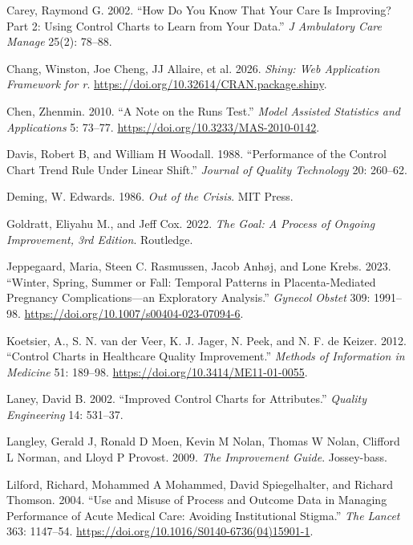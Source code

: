 \documentclass[
]{book}
\newlength{\cslhangindent}
\newenvironment{CSLReferences}[2] %
 {\begin{list}{}{%
  \setlength{\itemindent}{0pt}
  \setlength{\leftmargin}{0pt}
  \setlength{\parsep}{0pt}
  \ifodd #1
   \setlength{\leftmargin}{\cslhangindent}
   \setlength{\itemindent}{-1\cslhangindent}
  \fi
  \setlength{\itemsep}{#2\baselineskip}}}
 {\end{list}}
\begin{document}
\begin{CSLReferences}{1}{1}
Carey, Raymond G. 2002. {``How Do You Know That Your Care Is Improving?
Part 2: Using Control Charts to Learn from Your Data.''} \emph{J
Ambulatory Care Manage} 25(2): 78--88.

Chang, Winston, Joe Cheng, JJ Allaire, et al. 2026. \emph{Shiny: Web
Application Framework for r}.
\url{https://doi.org/10.32614/CRAN.package.shiny}.

Chen, Zhenmin. 2010. {``A Note on the Runs Test.''} \emph{Model Assisted
Statistics and Applications} 5: 73--77.
\url{https://doi.org/10.3233/MAS-2010-0142}.

Davis, Robert B, and William H Woodall. 1988. {``Performance of the
Control Chart Trend Rule Under Linear Shift.''} \emph{Journal of Quality
Technology} 20: 260--62.

Deming, W. Edwards. 1986. \emph{Out of the Crisis}. MIT Press.

Goldratt, Eliyahu M., and Jeff Cox. 2022. \emph{The Goal: A Process of
Ongoing Improvement, 3rd Edition}. Routledge.

Jeppegaard, Maria, Steen C. Rasmussen, Jacob Anhøj, and Lone Krebs.
2023. {``Winter, Spring, Summer or Fall: Temporal Patterns in
Placenta-Mediated Pregnancy Complications---an Exploratory Analysis.''}
\emph{Gynecol Obstet} 309: 1991--98.
\url{https://doi.org/10.1007/s00404-023-07094-6}.

Koetsier, A., S. N. van der Veer, K. J. Jager, N. Peek, and N. F. de
Keizer. 2012. {``Control Charts in Healthcare Quality Improvement.''}
\emph{Methods of Information in Medicine} 51: 189--98.
\url{https://doi.org/10.3414/ME11-01-0055}.

Laney, David B. 2002. {``Improved Control Charts for Attributes.''}
\emph{Quality Engineering} 14: 531--37.

Langley, Gerald J, Ronald D Moen, Kevin M Nolan, Thomas W Nolan,
Clifford L Norman, and Lloyd P Provost. 2009. \emph{The Improvement
Guide}. Jossey-bass.

Lilford, Richard, Mohammed A Mohammed, David Spiegelhalter, and Richard
Thomson. 2004. {``Use and Misuse of Process and Outcome Data in Managing
Performance of Acute Medical Care: Avoiding Institutional Stigma.''}
\emph{The Lancet} 363: 1147--54.
\url{https://doi.org/10.1016/S0140-6736(04)15901-1}.


\end{CSLReferences}
\end{document}
